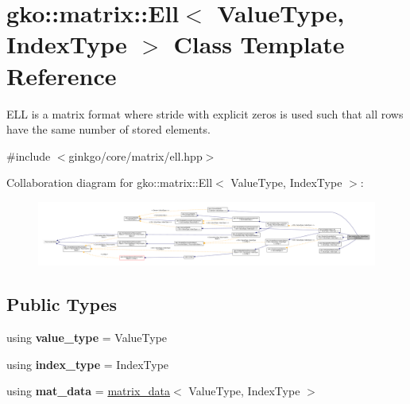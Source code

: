\hypertarget{classgko_1_1matrix_1_1Ell}{}\section{gko\+:\+:matrix\+:\+:Ell$<$ Value\+Type, Index\+Type $>$ Class Template Reference}
\label{classgko_1_1matrix_1_1Ell}


E\+LL is a matrix format where stride with explicit zeros is used such that all rows have the same number of stored elements.  




{\ttfamily \#include $<$ginkgo/core/matrix/ell.\+hpp$>$}



Collaboration diagram for gko\+:\+:matrix\+:\+:Ell$<$ Value\+Type, Index\+Type $>$\+:
\nopagebreak
\begin{figure}[H]
\begin{center}
\leavevmode
\includegraphics[width=350pt]{classgko_1_1matrix_1_1Ell__coll__graph}
\end{center}
\end{figure}
\subsection*{Public Types}
\begin{DoxyCompactItemize}
\item 
\mbox{\label{classgko_1_1matrix_1_1Ell_ae56802e0bd9f47e3d0029b6fdb37db6e}} 
using {\bfseries value\+\_\+type} = Value\+Type
\item 
\mbox{\label{classgko_1_1matrix_1_1Ell_a17e4809eeab4d76c2887d57e9b4b3cc4}} 
using {\bfseries index\+\_\+type} = Index\+Type
\item 
\mbox{\label{classgko_1_1matrix_1_1Ell_a993ff3d650fa2f2c72777b856531163a}} 
using {\bfseries mat\+\_\+data} = \hyperlink{structgko_1_1matrix__data}{matrix\+\_\+data}$<$ Value\+Type, Index\+Type $>$
\end{DoxyCompactItemize}
